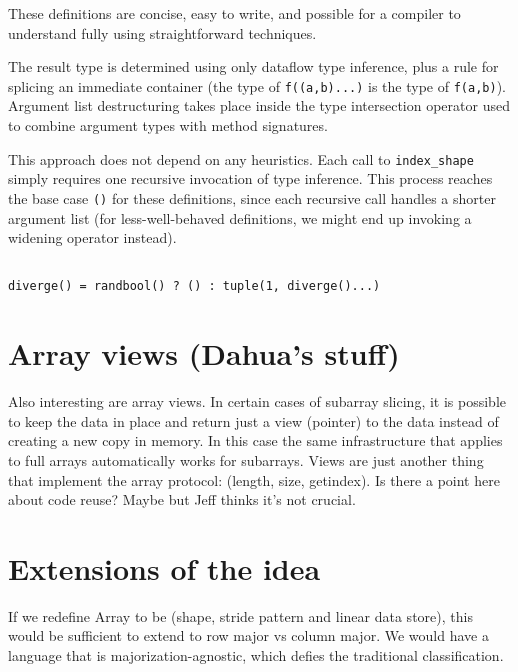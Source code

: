 \documentclass[preprint]{sigplanconf}
\begin{document}
These definitions are concise, easy to write, and possible for a compiler to
understand fully using straightforward techniques.


The result type is determined using only dataflow type inference, plus a rule
for splicing an immediate container (the type of \texttt{f((a,b)...)} is the
type of \texttt{f(a,b)}). Argument list destructuring takes place inside the
type intersection operator used to combine argument types with method
signatures.

This approach does not depend on any heuristics. Each call to
\texttt{index\_shape} simply requires one recursive invocation of type
inference. This process reaches the base case \texttt{()} for these
definitions, since each recursive call handles a shorter argument list (for
less-well-behaved definitions, we might end up invoking a widening operator
instead).

\begin{verbatim}

diverge() = randbool() ? () : tuple(1, diverge()...)

\end{verbatim}

\section{Array views (Dahua's stuff)}

Also interesting are array views. In certain cases of subarray slicing, it is
possible to keep the data in place and return just a view (pointer) to the
data instead of creating a new copy in memory. In this case the same
infrastructure that applies to full arrays automatically works for subarrays.
Views are just another thing that implement the array protocol: (length, size,
getindex). Is there a point here about code reuse? Maybe but Jeff thinks it's
not crucial.

\section{Extensions of the idea}

If we redefine Array to be (shape, stride pattern and linear data store), this
would be sufficient to extend to row major vs column major. We would have a
language that is majorization-agnostic, which defies the traditional
classification.
\end{document}
